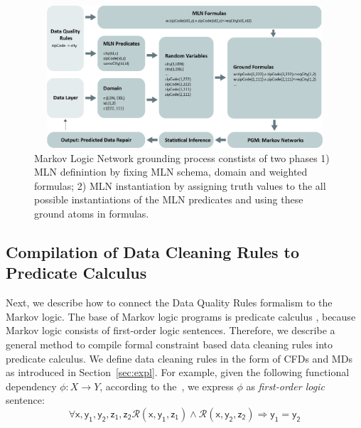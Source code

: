 \begin{figure}[t]
 \centering
 \includegraphics[width=450px, height=200px]{img/mlogic-grounging.jpg}
 \caption{ Markov Logic Network grounding process constists of two phases 1) MLN definintion by fixing MLN schema, domain and weighted formulas; 2) MLN instantiation by assigning truth values to the all possible instantiations of the MLN predicates and using these ground atoms in formulas.}
 \label{fig:mlngrounding}
\end{figure}

\subsection{Compilation of Data Cleaning Rules to Predicate Calculus}
\label{sec:ml} 

Next, we describe how to connect the Data Quality Rules formalism to the Markov logic. The base of Markov logic programs is predicate calculus \cite{genesereth1987logical}, because Markov logic consists of first-order logic sentences. Therefore, we describe a general method to compile formal constraint based data cleaning rules into predicate calculus. We define data cleaning rules in the form of CFDs and MDs as introduced in Section~\ref{sec:expl}. For example, given the following functional dependency $\phi: X \rightarrow Y$, according to the~\cite{Fagin:1982:HCD:322344.322347}, we express $\phi$ as \textit{first-order logic} sentence:
\begin{equation}
\mathsf{\forall x, y_1, y_2, z_1, z_2 \mathcal{R}(x, y_1, z_1) \wedge \mathcal{R}(x, y_2, z_2) \Rightarrow y_1=y_2}
\label{fd2fol}
\end{equation}

